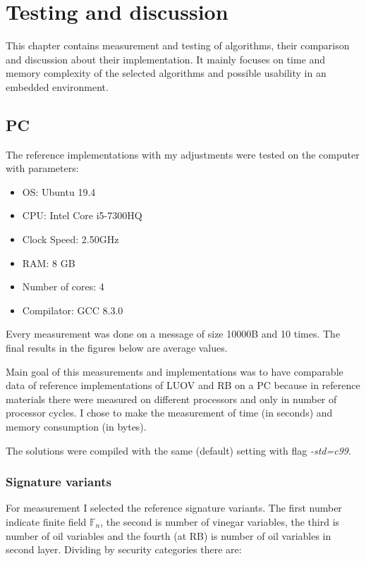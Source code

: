 \documentclass[thesis=M,english]{FITthesis}[2019/12/23]
\begin{document}
\chapter{Testing and discussion} \label{test-and-disk}
This chapter contains measurement and testing of algorithms, their comparison and discussion about their implementation. It mainly focuses on time and memory complexity of the selected algorithms and possible usability in an embedded environment.

\section{PC}
The reference implementations with my adjustments were tested on the computer with parameters:
\begin{itemize}
\item OS: Ubuntu 19.4
\item CPU: Intel Core i5-7300HQ
\item Clock Speed: 2.50GHz
\item RAM: 8 GB
\item Number of cores: 4
\item Compilator: GCC 8.3.0
\end{itemize}

\bigskip
\noindent
Every measurement was done on a message of size 10000B and 10 times. The final results in the figures below are average values.

\bigskip
\noindent
Main goal of this measurements and implementations was to have comparable data of reference implementations of LUOV and RB on a PC because in reference materials there were measured on different processors and only in number of processor cycles. I chose to make the measurement of time (in seconds) and memory consumption (in bytes).

\bigskip
\noindent
The solutions were compiled with the same (default) setting with flag \textit{-std=c99}.

\subsection{Signature variants} \label{pc-sign-variants}
For measurement I selected the reference signature variants. The first number indicate finite field $\mathbb{F}_{n}$, the second is number of vinegar variables, the third is number of oil variables and the fourth (at RB) is number of oil variables in second layer. Dividing by security categories there are:
\end{document}
